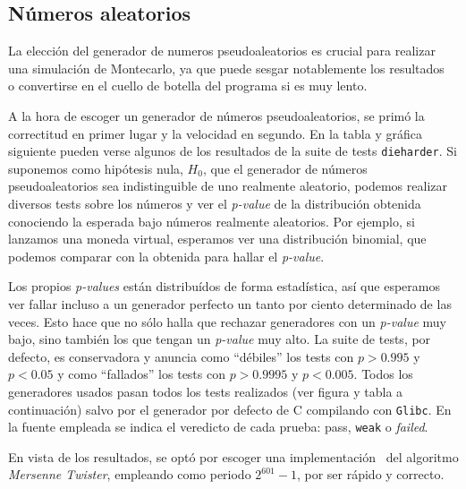 \documentclass[11pt]{report}
\begin{document}
\begin{appendices}
\chapter{Números aleatorios}
\label{chap:random}





La elección del generador de numeros pseudoaleatorios es crucial para
realizar una simulación de Montecarlo, ya que puede sesgar
notablemente los resultados~\cite{randommonte}\cite{randomcoins} o
convertirse en el cuello de botella del programa si es muy lento.

A la hora de escoger un generador de números pseudoaleatorios, se primó la
correctitud en primer lugar y la velocidad en segundo. En la tabla
y gráfica siguiente pueden verse algunos de los resultados de la suite de tests
\verb|dieharder|. Si suponemos como hipótesis nula, $H_0$, que el
generador de números pseudoaleatorios sea indistinguible de uno
realmente aleatorio, podemos realizar diversos tests sobre los números
y ver el \textit{p-value} de la distribución obtenida conociendo la
esperada bajo números realmente aleatorios. Por ejemplo, si lanzamos
una moneda virtual, esperamos ver una distribución binomial, que
podemos comparar con la obtenida para hallar el \textit{p-value}.

Los propios \textit{p-values} están distribuídos de forma estadística,
así que esperamos ver fallar incluso a un generador perfecto un tanto
por ciento determinado de las veces. Esto hace que no sólo halla que
rechazar generadores con un \textit{p-value} muy bajo, sino también
los que tengan un \textit{p-value} muy alto. La suite de tests, por
defecto, es conservadora y anuncia como ``débiles'' los tests con
$p>0.995$ y $p<0.05$ y como ``fallados'' los tests con
$p>0.9995$ y $p < 0.005$. Todos los generadores usados pasan todos los tests
realizados (ver figura y tabla a continuación) salvo por el generador
por defecto de C compilando con \verb~Glibc~.
En la fuente empleada se indica el veredicto de cada prueba:
\textcolor{PASSED}{pass}, \textcolor{WEAK}{\texttt{weak}} o
\textcolor{FAILED}{\textit{failed}}.

En vista de los resultados, se optó por escoger una
implementación~\cite{sfmt} del algoritmo \textit{Mersenne Twister},
empleando como periodo $2^{601}-1$, por ser rápido y correcto.


\end{appendices}
\end{document}
